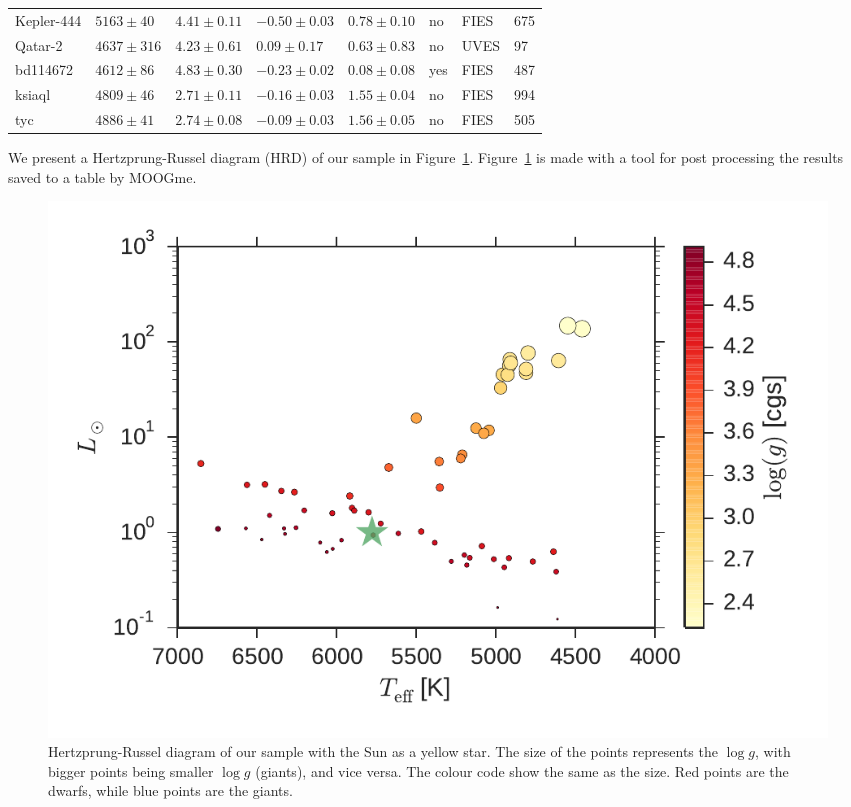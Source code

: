 \documentclass{aa}
\begin{document}
\begin{table}[htb!]
\begin{tabular}{llllllll}
   Kepler-444     &  $5163 \pm  40$      &  $4.41 \pm 0.11$    &  $-0.50 \pm 0.03$    &  $0.78 \pm 0.10$             &             no              & FIES         &  675  \\  %
      Qatar-2     &  $4637 \pm 316$      &  $4.23 \pm 0.61$    &  $ 0.09 \pm 0.17$    &  $0.63 \pm 0.83$             &             no              & UVES         &   97  \\  %
     bd114672     &  $4612 \pm  86$      &  $4.83 \pm 0.30$	   &  $-0.23 \pm 0.02$    &  $0.08 \pm 0.08$             &             yes             & FIES         &  487  \\
       ksiaql     &  $4809 \pm  46$      &  $2.71 \pm 0.11$	   &  $-0.16 \pm 0.03$    &  $1.55 \pm 0.04$             &             no              & FIES         &  994  \\
          tyc     &  $4886 \pm  41$      &  $2.74 \pm 0.08$	   &  $-0.09 \pm 0.03$    &  $1.56 \pm 0.05$             &             no              & FIES         &  505  \\
      \hline
    \end{tabular}
\end{table}
We present a Hertzprung-Russel diagram (HRD) of our sample in
Figure~\ref{fig:HRD}. Figure~\ref{fig:HRD} is made with a tool for post
processing the results saved to a table by MOOGme.

\begin{figure}[tpb]
    \centering
    \includegraphics[width=1.0\linewidth]{figures/HR.pdf}
    \caption{Hertzprung-Russel diagram of our sample with the Sun as a yellow
    star. The size of the points represents the $\log g$, with bigger points
    being smaller $\log g$ (giants), and vice versa. The colour code show the
    same as the size. Red points are the dwarfs, while blue points are the
    giants.}
    \label{fig:HRD}
\end{figure}
\end{document}
